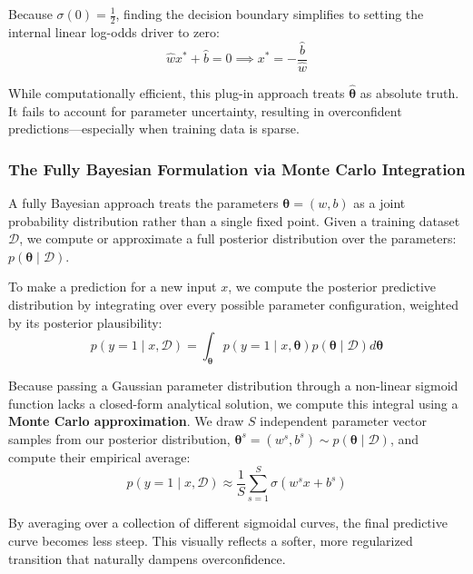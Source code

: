 \documentclass{article}
\begin{document}
Because $\sigma(0) = \frac{1}{2}$, finding the decision boundary simplifies to setting the internal linear log-odds driver to zero:
\begin{equation}
\hat{w}x^* + \hat{b} = 0 \implies x^* = -\frac{\hat{b}}{\hat{w}}
\end{equation}

While computationally efficient, this plug-in approach treats $\hat{\boldsymbol{\theta}}$ as absolute truth. It fails to account for parameter uncertainty, resulting in overconfident predictions—especially when training data is sparse.

\subsubsection{The Fully Bayesian Formulation via Monte Carlo Integration}
A fully Bayesian approach treats the parameters $\boldsymbol{\theta} = (w, b)$ as a joint probability distribution rather than a single fixed point. Given a training dataset $\mathcal{D}$, we compute or approximate a full posterior distribution over the parameters: $p(\boldsymbol{\theta} \mid \mathcal{D})$.

To make a prediction for a new input $x$, we compute the posterior predictive distribution by integrating over every possible parameter configuration, weighted by its posterior plausibility:
\begin{equation}
p(y = 1 \mid x, \mathcal{D}) = \int_{\boldsymbol{\theta}} p(y = 1 \mid x, \boldsymbol{\theta}) p(\boldsymbol{\theta} \mid \mathcal{D}) d\boldsymbol{\theta}
\end{equation}

Because passing a Gaussian parameter distribution through a non-linear sigmoid function lacks a closed-form analytical solution, we compute this integral using a \textbf{Monte Carlo approximation}. We draw $S$ independent parameter vector samples from our posterior distribution, $\boldsymbol{\theta}^s = (w^s, b^s) \sim p(\boldsymbol{\theta} \mid \mathcal{D})$, and compute their empirical average:
\begin{equation}
p(y = 1 \mid x, \mathcal{D}) \approx \frac{1}{S} \sum_{s=1}^S \sigma(w^s x + b^s)
\end{equation}



By averaging over a collection of different sigmoidal curves, the final predictive curve becomes less steep. This visually reflects a softer, more regularized transition that naturally dampens overconfidence. 
\end{document}
